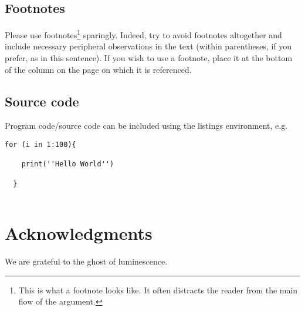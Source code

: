 \documentclass{article}
\begin{document}
 
\subsection{Footnotes}

Please use footnotes\footnote {This is what a footnote looks like.  It
often distracts the reader from the main flow of the argument.} sparingly.
Indeed, try to avoid footnotes altogether and include necessary peripheral
observations in
the text (within parentheses, if you prefer, as in this sentence).  If you
wish to use a footnote, place it at the bottom of the column on the page on
which it is referenced. 

\subsection{Source code}

Program code/source code can be included using the listings environment, e.g.

\begin{lstlisting}[caption = A simple for-loop]
  for (i in 1:100){
  
    print(''Hello World'')
  
  }
  
\end{lstlisting}



\vspace*{20 pt}

\section*{Acknowledgments} 
We are grateful to the ghost of luminescence.


\vspace*{16pt}

{\small


}

\end{document}
